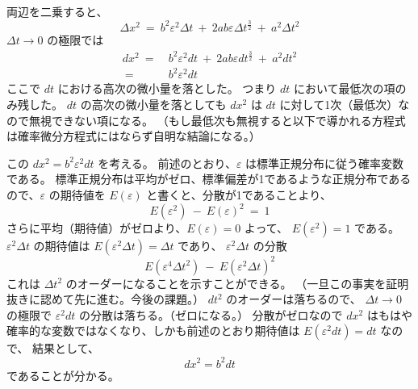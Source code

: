 \documentclass[uplatex,a4j,12pt,dvipdfmx]{jsarticle}
\begin{document}
両辺を二乗すると、
$$
	\Delta x^{2}
	\ = \
	b^{2} \varepsilon^{2} \Delta t
	\ + \
	2 a b \varepsilon \Delta t^{\frac{3}{2}}
	\ + \
	a^{2} \Delta t^{2}
$$
$\Delta t \to 0$ の極限では
\begin{align}
	d x^{2}
	\ = & \
	b^{2} \varepsilon^{2} dt
	\ + \
	2 a b \varepsilon dt^{\frac{3}{2}}
	\ + \
	a^{2} d t^{2}
	\\
	\ = & \
	b^{2} \varepsilon^{2} dt
\end{align}
ここで $dt$ における高次の微小量を落とした。
つまり $dt$ において最低次の項のみ残した。
$dt$ の高次の微小量を落としても $dx^{2}$ は $dt$ に対して1次（最低次）なので無視できない項になる。
（もし最低次も無視すると以下で導かれる方程式は確率微分方程式にはならず自明な結論になる。）

この $dx^{2} = b^{2} \varepsilon^{2} dt$ を考える。
前述のとおり、$\varepsilon$ は標準正規分布に従う確率変数である。
標準正規分布は平均がゼロ、標準偏差が1であるような正規分布であるので、$\varepsilon$ の期待値を $E(\varepsilon)$ と書くと、分散が1であることより、
$$
	E(\varepsilon^{2})
	\ - \
	E(\varepsilon)^{2}
	\ = \
	1
$$
さらに平均（期待値）がゼロより、$E(\varepsilon)=0$
よって、
$E(\varepsilon^{2})=1$
である。
$\varepsilon^{2} \Delta t$ の期待値は
$E(\varepsilon^{2} \Delta t) = \Delta t$ であり、
$\varepsilon^{2} \Delta t$ の分散
$$
	E(\varepsilon^{4} \Delta t^{2})
	\ - \
	E(\varepsilon^{2} \Delta t)^{2}
$$
これは $\Delta t^{2}$ のオーダーになることを示すことができる。
（一旦この事実を証明抜きに認めて先に進む。今後の課題。）
$d t^{2}$ のオーダーは落ちるので、
$\Delta t \to 0$ の極限で
$\varepsilon^{2} d t$ の分散は落ちる。（ゼロになる。）
分散がゼロなので $dx^{2}$ はもはや確率的な変数ではなくなり、しかも前述のとおり期待値は
$E(\varepsilon^{2} d t) = d t$ なので、
結果として、
$$
	dx^{2} = b^{2} dt
$$
であることが分かる。
\end{document}
